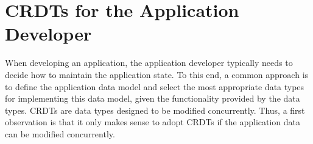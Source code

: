 \documentclass[11pt,a4paper]{article}
\begin{document}
%
%


\section{CRDTs for the Application Developer}\label{sec:appdev}

When developing an application, the application developer typically needs to decide 
how to maintain the application state. 
To this end, a common approach is to define the application data model and select 
the most appropriate data types for implementing this data model, given the 
functionality provided by the data types. 
CRDTs are data types designed to be modified concurrently. 
Thus, a first observation is that it only makes sense to adopt CRDTs if the 
application data can be modified concurrently.
\end{document}
